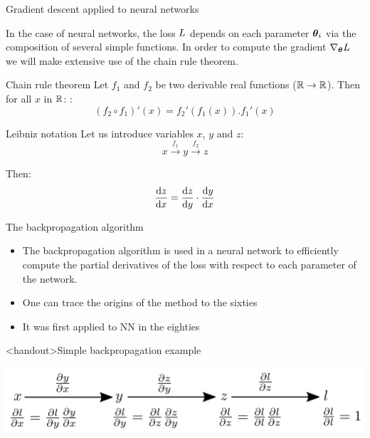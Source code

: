 \documentclass[xcolor=pdftex,dvipsnames,table,mathserif]{beamer}
\begin{document}
\begin{frame}{Gradient descent applied to neural networks}

  In the case of neural networks, the loss $L$ depends on each parameter $\boldsymbol{\theta}_i$ via the composition of several simple functions. In order to compute the gradient $\nabla_{\boldsymbol{\theta}}L$ we will make extensive use of the chain rule theorem.

  \begin{block}{Chain rule theorem}
    Let $f_1$ and $f_2$ be two derivable real functions ($\mathbb{R} \rightarrow \mathbb{R}$). Then for all $x$ in $\mathbb{R}$:   :
    \[
     (f_2 \circ f_1)'(x) = f_2'(f_1(x)).f_1'(x)
    \]
  \end{block}


\begin{block}{Leibniz notation}
  Let us introduce variables $x$, $y$ and $z$:
  \[x \xrightarrow{f_1} y \xrightarrow{f_2} z\]

  Then:
  \[\dv{z}{x} = \dv{z}{y} \cdot \dv{y}{x} \]

\end{block}

\end{frame}


\begin{frame}{The backpropagation algorithm}

  \begin{itemize}
  \item The backpropagation algorithm is used in a neural network to efficiently compute the partial derivatives of the loss with respect to each parameter of the network.
  \item One can trace the origins of the method to the sixties
  \item It was first applied to NN in the eighties \cite{werbos_applications_1982, lecun_procedure_1985}
  \end{itemize}


\end{frame}



\begin{frame}<handout>{Simple backpropagation example}

\includegraphics[width=\textwidth]{bp_simple.png}

\end{frame}
\end{document}
